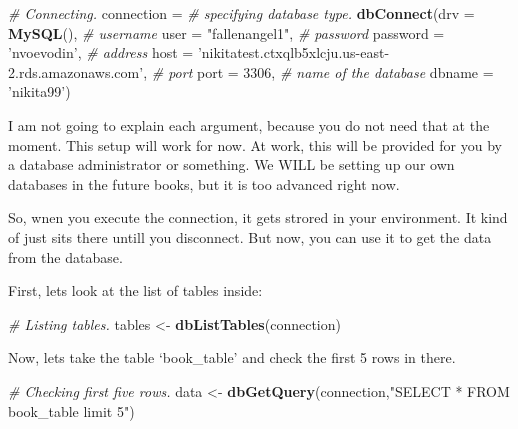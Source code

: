 \documentclass[]{book}
\newenvironment{Shaded}{\begin{snugshade}}{\end{snugshade}}
\newcommand{\CommentTok}[1]{\textcolor[rgb]{0.56,0.35,0.01}{\textit{#1}}}
\newcommand{\DataTypeTok}[1]{\textcolor[rgb]{0.13,0.29,0.53}{#1}}
\newcommand{\DecValTok}[1]{\textcolor[rgb]{0.00,0.00,0.81}{#1}}
\newcommand{\KeywordTok}[1]{\textcolor[rgb]{0.13,0.29,0.53}{\textbf{#1}}}
\newcommand{\NormalTok}[1]{#1}
\newcommand{\StringTok}[1]{\textcolor[rgb]{0.31,0.60,0.02}{#1}}
\begin{document}
\begin{Shaded}
\begin{Highlighting}[]
\CommentTok{# Connecting.}
\NormalTok{connection =}\StringTok{ }
\CommentTok{# specifying database type.}
\StringTok{  }\KeywordTok{dbConnect}\NormalTok{(}\DataTypeTok{drv =} \KeywordTok{MySQL}\NormalTok{(),  }
\CommentTok{# username}
    \DataTypeTok{user =} \StringTok{"fallenangel1"}\NormalTok{, }
\CommentTok{# password}
    \DataTypeTok{password =} \StringTok{'nvoevodin'}\NormalTok{, }
\CommentTok{# address}
    \DataTypeTok{host =} \StringTok{'nikitatest.ctxqlb5xlcju.us-east-2.rds.amazonaws.com'}\NormalTok{, }
\CommentTok{# port}
    \DataTypeTok{port =} \DecValTok{3306}\NormalTok{, }
\CommentTok{# name of the database}
    \DataTypeTok{dbname =} \StringTok{'nikita99'}\NormalTok{) }
\end{Highlighting}
\end{Shaded}

I am not going to explain each argument, because you do not need that at the moment. This setup will work for now. At work, this will be provided for you by a database administrator or something. We WILL be setting up our own databases in the future books, but it is too advanced right now.

So, wnen you execute the connection, it gets strored in your environment. It kind of just sits there untill you disconnect. But now, you can use it to get the data from the database.

First, lets look at the list of tables inside:

\begin{Shaded}
\begin{Highlighting}[]
\CommentTok{# Listing tables.}
\NormalTok{tables <-}\StringTok{ }\KeywordTok{dbListTables}\NormalTok{(connection)}
\end{Highlighting}
\end{Shaded}

Now, lets take the table `book\_table' and check the first 5 rows in there.

\begin{Shaded}
\begin{Highlighting}[]
\CommentTok{# Checking first five rows.}
\NormalTok{data <-}\StringTok{ }\KeywordTok{dbGetQuery}\NormalTok{(connection,}\StringTok{"SELECT * FROM book_table limit 5"}\NormalTok{)}
\end{Highlighting}
\end{Shaded}
\end{document}
